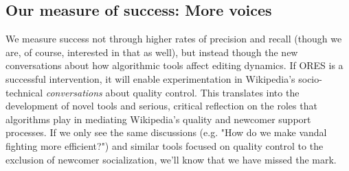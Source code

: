 \subsection{Our measure of success: More voices}
We measure success not through higher rates of precision and recall (though we are, of course, interested in that as well), but instead though the new conversations about how algorithmic tools affect editing dynamics.  If ORES is a successful intervention, it will enable experimentation in Wikipedia's socio-technical \emph{conversations} about quality control.  This translates into the development of novel tools and serious, critical reflection on the roles that algorithms play in mediating Wikipedia's quality and newcomer support processes. If we only see the same discussions (e.g. "How do we make vandal fighting more efficient?") and similar tools focused on quality control to the exclusion of newcomer socialization, we'll know that we have missed the mark.
